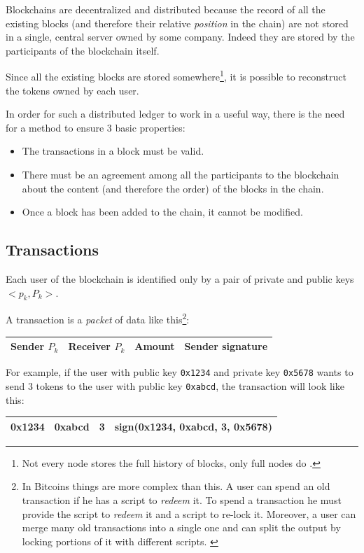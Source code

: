 \documentclass[12pt]{article}
\begin{document}
Blockchains are decentralized and distributed because the record of all the existing blocks (and therefore their relative \textit{position} in the chain) are not stored in a single, central server owned by some company. 
Indeed they are stored by the participants of the blockchain itself.

Since all the existing blocks are stored somewhere\footnote{Not every node stores the full history of blocks, only full nodes do \cite{bitcoin_full_nodes}.}, it is possible to reconstruct the tokens owned by each user.

In order for such a distributed ledger to work in a useful way, there is the need for a method to ensure 3 basic properties:
\begin{itemize}
    \item The transactions in a block must be valid.
    \item There must be an agreement among all the participants to the blockchain about the content (and therefore the order) of the blocks in the chain.
    \item Once a block has been added to the chain, it cannot be modified.
\end{itemize}

\subsection{Transactions} \label{subsection:transactions}
Each user of the blockchain is identified only by a pair of private and public keys \(<p_k, P_k>\).

A transaction is a \textit{packet} of data like this\footnote{In Bitcoins things are more complex than this. A user can spend an old transaction if he has a script to \textit{redeem} it. To spend a transaction he must provide the script to \textit{redeem} it and a script to re-lock it. Moreover, a user can merge many old transactions into a single one and can split the output by locking portions of it with different scripts. \cite{bitcoin_transactions}}:
\begin{table}[h]
    \centering
    \begin{tabular}{|c|c|c|c|}
        \hline
        Sender \(P_k\) & Receiver \(P_k\) & Amount & Sender signature \\
        \hline
    \end{tabular}
    \label{table:transaction}
\end{table}

For example, if the user with public key \verb|0x1234| and private key \verb|0x5678| wants to send 3 tokens to the user with public key \verb|0xabcd|, the transaction will look like this:
\begin{table}[h]
    \centering
    \begin{tabular}{|c|c|c|c|}
        \hline
        0x1234 & 0xabcd & 3 & sign(0x1234, 0xabcd, 3, 0x5678) \\
        \hline
    \end{tabular}
    \label{table:transactionExample}
\end{table}
\end{document}
